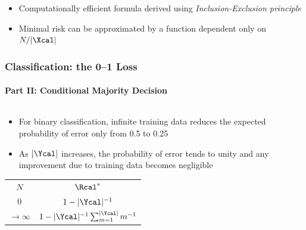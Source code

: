 \documentclass[aspectratio=169,usenames,dvipsnames]{beamer}
\begin{document}
\begin{frame}
\begin{columns}[c]
\begin{column}{.45\linewidth}
\end{column}

\end{columns}

\vspace{1em}
\begin{itemize}
\item \alert{Computationally efficient} formula derived using \emph{Inclusion-Exclusion principle}
\vspace{0.25em}
\item Minimal risk can be approximated by a function dependent only on $N/|\Xcal|$
\end{itemize}

\end{frame}



\begin{frame}
\frametitle{Classification: the 0--1 Loss}
\framesubtitle{Part II: Conditional Majority Decision}

\begin{columns}[c]

\begin{column}{.5\linewidth}

\begin{itemize}
\item For binary classification, infinite training data reduces the expected probability of error only from \alert{0.5} to \alert{0.25}
\vspace{0.5em}
\item As $|\Ycal|$ increases, the probability of error tends to unity and any improvement due to training data becomes \alert{negligible}
\end{itemize}

\begin{table}
\renewcommand{\arraystretch}{1.3}
\begin{tabular}{| c | c |}
\hline 
$N$ & $\Rcal^*$ \\
\hhline{|=|=|}
$0$ & $1 - |\Ycal|^{-1}$  \\ 
\hline
$\to \infty$ & $1 - |\Ycal|^{-1} \sum_{m=1}^{|\Ycal|} m^{-1}$ \\
\hline
\end{tabular}
\end{table}

\end{column}

\begin{column}{.5\linewidth}


\end{column}
\end{columns}
\end{frame}
\end{document}

